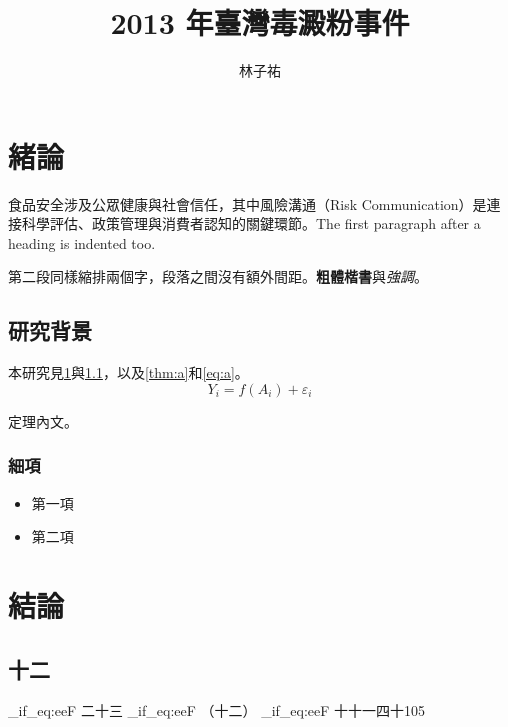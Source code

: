 \documentclass[lang=zh, thmnames=native, par=indent, secnum=zh, 13pt, kai,
  text=times]{akizumi-note}
\title{2013 年臺灣毒澱粉事件}
\author{林子祐}
\begin{document}
\maketitle

\section{緒論}\label{sec:intro}
食品安全涉及公眾健康與社會信任，其中風險溝通（Risk Communication）是連接科學評估、政策管理與消費者認知的關鍵環節。The first paragraph after a heading is indented too.

第二段同樣縮排兩個字，段落之間沒有額外間距。\textbf{粗體楷書}與\emph{強調}。

\subsection{研究背景}\label{sec:bg}
本研究見\cref{sec:intro}與\cref{sec:bg}，以及\cref{thm:a}和\cref{eq:a}。
\begin{equation}\label{eq:a} Y_i = f(A_i) + \varepsilon_i \end{equation}

\begin{theorem}\label{thm:a}
定理內文。
\end{theorem}

\subsubsection{細項}
\begin{itemize}
  \item 第一項
  \item 第二項
\end{itemize}

\setcounter{section}{22}
\section{結論}
\setcounter{subsection}{11}
\subsection{十二}

\ExplSyntaxOn
\str_if_eq:eeF { \thesection } { 二十三 } { \ERROR }
\str_if_eq:eeF { \thesubsection } { （十二） } { \ERROR }
\str_if_eq:eeF {  } { 十十一四十105 } { \ERROR }
\ExplSyntaxOff
\ifdim\parindent=26pt \else\ERROR\fi  %
\end{document}
